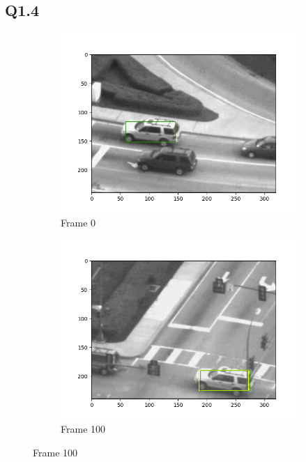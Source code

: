 \documentclass{article} %
\begin{document}
    \subsection*{Q1.4}
    \begin{figure}[H]
        \centering
        \begin{subfigure}[b]{0.30\textwidth}
            \centering
            \includegraphics[width=\textwidth]{q1,4_frame0.png}
            \caption{Frame 0}
        \end{subfigure}
        \begin{subfigure}[b]{0.30\textwidth}
            \centering
            \includegraphics[width=\textwidth]{q1,4_frame100.png}
            \caption{Frame 100}

\end{subfigure}
\end{figure}
\end{document}
